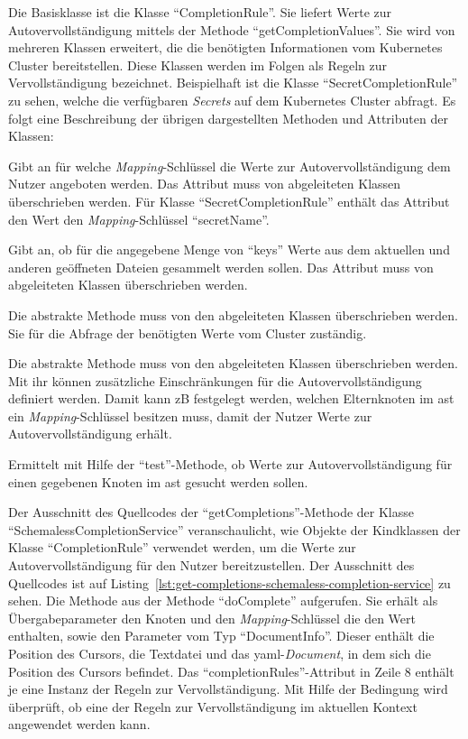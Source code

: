 Die Basisklasse ist die Klasse ``CompletionRule''. Sie liefert Werte zur Autovervollständigung mittels der Methode ``getCompletionValues''.
Sie wird von mehreren Klassen erweitert, die die benötigten Informationen vom Kubernetes Cluster bereitstellen. Diese Klassen
werden im Folgen als Regeln zur Vervollständigung bezeichnet.
Beispielhaft ist die Klasse ``SecretCompletionRule'' zu sehen, welche die verfügbaren \textit{Secrets} auf dem Kubernetes Cluster abfragt.
Es folgt eine Beschreibung der übrigen dargestellten Methoden und Attributen der Klassen:
\begin{description}
      \setlength\itemsep{-0.5cm}
      \item[keys]
            Gibt an für welche \textit{Mapping}-Schlüssel die Werte zur Autovervollständigung dem Nutzer angeboten werden.
            Das Attribut muss von abgeleiteten Klassen überschrieben werden.
            Für Klasse ``SecretCompletionRule'' enthält das Attribut den Wert den \textit{Mapping}-Schlüssel ``secretName''.
      \item[shouldCollectValuesFromDocuments]
            Gibt an, ob für die angegebene Menge von ``keys'' Werte aus dem aktuellen und anderen geöffneten Dateien gesammelt werden sollen.
            Das Attribut muss von abgeleiteten Klassen überschrieben werden.
      \item[getApiCompletionValues]
            Die abstrakte Methode muss von den abgeleiteten Klassen überschrieben werden. Sie für die Abfrage der benötigten Werte vom Cluster zuständig.
      \item[test]
            Die abstrakte Methode muss von den abgeleiteten Klassen überschrieben werden. Mit ihr können zusätzliche Einschränkungen
            für die Autovervollständigung definiert werden. Damit kann \ac{zB} festgelegt werden, welchen Elternknoten im \ac{ast}
            ein \textit{Mapping}-Schlüssel besitzen muss, damit der Nutzer Werte zur Autovervollständigung erhält.
      \item[isApplicable]
            Ermittelt mit Hilfe der ``test''-Methode, ob Werte zur Autovervollständigung für einen gegebenen Knoten im \ac{ast}
            gesucht werden sollen.
\end{description}

Der Ausschnitt des Quellcodes der ``getCompletions''-Methode der Klasse ``SchemalessCompletionService'' veranschaulicht, wie Objekte der
Kindklassen der Klasse ``CompletionRule'' verwendet werden, um die Werte zur Autovervollständigung für den Nutzer bereitzustellen.
Der Ausschnitt des Quellcodes ist auf Listing~\ref{lst:get-completions-schemaless-completion-service} zu sehen. Die Methode aus der Methode ``doComplete'' aufgerufen.
Sie erhält als Übergabeparameter den Knoten und den \textit{Mapping}-Schlüssel die den Wert enthalten, sowie den Parameter vom Typ
``DocumentInfo''. Dieser enthält die Position des Cursors, die Textdatei und das \ac{yaml}-\textit{Document}, in dem sich die
Position des Cursors befindet. Das ``completionRules''-Attribut in Zeile 8 enthält je eine Instanz der Regeln zur Vervollständigung.
Mit Hilfe der Bedingung wird überprüft, ob eine der Regeln zur Vervollständigung im aktuellen Kontext angewendet werden kann.

